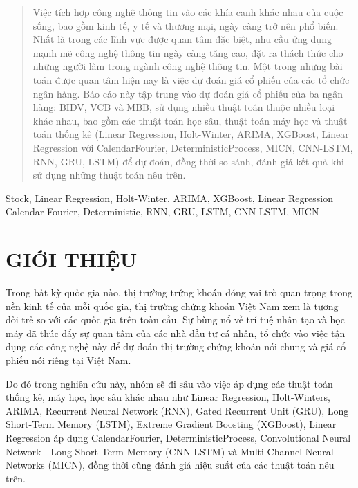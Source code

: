 \documentclass[conference]{IEEEtran}
\begin{document}
\maketitle

\begin{abstract}
Việc tích hợp công nghệ thông tin vào các khía cạnh khác nhau của cuộc sống, bao gồm kinh tế, y tế và thương mại, ngày càng trở nên phổ biến. Nhất là trong các lĩnh vực được quan tâm đặc biệt, nhu cầu ứng dụng mạnh mẽ công nghệ thông tin ngày càng tăng cao, đặt ra thách thức cho những người làm trong ngành công nghệ thông tin. Một trong những bài toán được quan tâm hiện nay là việc dự đoán giá cổ phiếu của các tổ chức ngân hàng. Báo cáo này tập trung vào dự đoán giá cổ phiếu của ba ngân hàng: BIDV, VCB và MBB, sử dụng nhiều thuật toán thuộc nhiều loại khác nhau, bao gồm các thuật toán học sâu, thuật toán máy học và thuật toán thống kê (Linear Regression, Holt-Winter, ARIMA, XGBoost, Linear Regression với CalendarFourier, DeterministicProcess, MICN, CNN-LSTM, RNN, GRU, LSTM) để dự đoán, đồng thời so sánh, đánh giá kết quả khi sử dụng những thuật toán nêu trên.
\end{abstract}

\begin{IEEEkeywords}
Stock, Linear Regression, Holt-Winter, ARIMA, XGBoost, Linear Regression Calendar Fourier, Deterministic, RNN, GRU, LSTM, CNN-LSTM, MICN
\end{IEEEkeywords}

\section{GIỚI THIỆU}
Trong bất kỳ quốc gia nào, thị trường trứng khoán đóng vai trò quan trọng trong nền kinh tế của mỗi quốc gia, thị trường chứng khoán Việt Nam xem là tương đối trẻ so với các quốc gia trên toàn cầu. Sự bùng nổ về trí tuệ nhân tạo và học máy đã thúc đẩy sự quan tâm của các nhà đầu tư cá nhân, tổ chức vào việc tận dụng các công nghệ này để dự đoán thị trường chứng khoán nói chung và giá cổ phiếu nói riêng tại Việt Nam. 

Do đó trong nghiên cứu này, nhóm sẽ đi sâu vào việc áp dụng các thuật toán thống kê, máy học, học sâu khác nhau như Linear Regression, Holt-Winters, ARIMA, Recurrent Neural Network (RNN), Gated Recurrent Unit (GRU), Long Short-Term Memory (LSTM), Extreme Gradient Boosting (XGBoost), Linear Regression áp dụng CalendarFourier, DeterministicProcess, Convolutional Neural Network - Long Short-Term Memory (CNN-LSTM) và Multi-Channel Neural Networks (MICN), đồng thời cũng đánh giá hiệu suất của các thuật toán nêu trên. 
\end{document}
